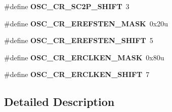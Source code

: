 \begin{DoxyCompactItemize}
\item 
\hypertarget{group___o_s_c___register___masks_ga0ec9adaf1ca3ec309f1a2c2fd37d3f4d}{}\#define {\bfseries O\+S\+C\+\_\+\+C\+R\+\_\+\+S\+C2\+P\+\_\+\+S\+H\+I\+F\+T}~3\label{group___o_s_c___register___masks_ga0ec9adaf1ca3ec309f1a2c2fd37d3f4d}

\item 
\hypertarget{group___o_s_c___register___masks_ga3024913f44011d333c6f48ddb00fbf9d}{}\#define {\bfseries O\+S\+C\+\_\+\+C\+R\+\_\+\+E\+R\+E\+F\+S\+T\+E\+N\+\_\+\+M\+A\+S\+K}~0x20u\label{group___o_s_c___register___masks_ga3024913f44011d333c6f48ddb00fbf9d}

\item 
\hypertarget{group___o_s_c___register___masks_gac1b9c5d7f156f1792255204dae816aba}{}\#define {\bfseries O\+S\+C\+\_\+\+C\+R\+\_\+\+E\+R\+E\+F\+S\+T\+E\+N\+\_\+\+S\+H\+I\+F\+T}~5\label{group___o_s_c___register___masks_gac1b9c5d7f156f1792255204dae816aba}

\item 
\hypertarget{group___o_s_c___register___masks_gab96140627de270278cbdfc81fbef63fc}{}\#define {\bfseries O\+S\+C\+\_\+\+C\+R\+\_\+\+E\+R\+C\+L\+K\+E\+N\+\_\+\+M\+A\+S\+K}~0x80u\label{group___o_s_c___register___masks_gab96140627de270278cbdfc81fbef63fc}

\item 
\hypertarget{group___o_s_c___register___masks_ga56f4aa6f215268327accda5434671187}{}\#define {\bfseries O\+S\+C\+\_\+\+C\+R\+\_\+\+E\+R\+C\+L\+K\+E\+N\+\_\+\+S\+H\+I\+F\+T}~7\label{group___o_s_c___register___masks_ga56f4aa6f215268327accda5434671187}

\end{DoxyCompactItemize}


\subsection{Detailed Description}
